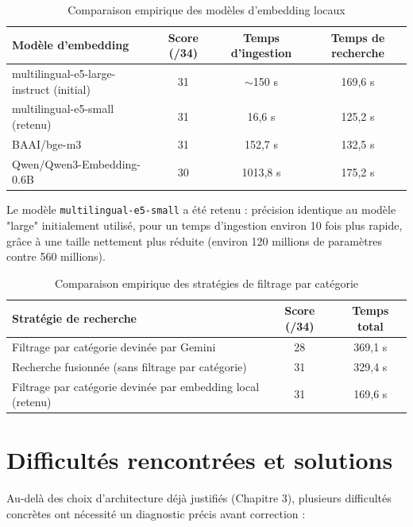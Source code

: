 \documentclass[12pt,a4paper]{report}
\begin{document}
\begin{table}[h]
\centering
\begin{tabular}{lccc}
\toprule
Modèle d'embedding & Score (/34) & Temps d'ingestion & Temps de recherche \\
\midrule
multilingual-e5-large-instruct (initial) & 31 & $\sim$150 s & 169,6 s \\
multilingual-e5-small (retenu) & 31 & 16,6 s & 125,2 s \\
BAAI/bge-m3 & 31 & 152,7 s & 132,5 s \\
Qwen/Qwen3-Embedding-0.6B & 30 & 1013,8 s & 175,2 s \\
\bottomrule
\end{tabular}
\caption{Comparaison empirique des modèles d'embedding locaux}
\label{tab:embedding-comparaison}
\end{table}

Le modèle \texttt{multilingual-e5-small} a été retenu : précision
identique au modèle "large" initialement utilisé, pour un temps
d'ingestion environ 10 fois plus rapide, grâce à une taille nettement
plus réduite (environ 120 millions de paramètres contre 560 millions).

\begin{table}[h]
\centering
\begin{tabular}{lcc}
\toprule
Stratégie de recherche & Score (/34) & Temps total \\
\midrule
Filtrage par catégorie devinée par Gemini & 28 & 369,1 s \\
Recherche fusionnée (sans filtrage par catégorie) & 31 & 329,4 s \\
Filtrage par catégorie devinée par embedding local (retenu) & 31 & 169,6 s \\
\bottomrule
\end{tabular}
\caption{Comparaison empirique des stratégies de filtrage par catégorie}
\label{tab:filtrage-comparaison}
\end{table}

\section{Difficultés rencontrées et solutions}

Au-delà des choix d'architecture déjà justifiés (Chapitre 3), plusieurs
difficultés concrètes ont nécessité un diagnostic précis avant
correction :
\end{document}
